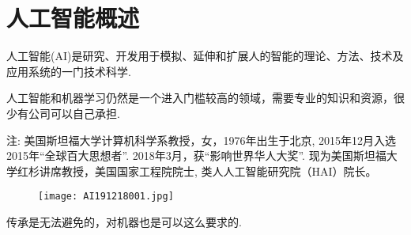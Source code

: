 \chapter{人工智能概述}
\begin{tcolorbox}[colback=white!50,colframe=orange!50,title=人工智能]
\begin{center}
   人工智能(AI)是研究、开发用于模拟、延伸和扩展人的智能的理论、方法、技术及应用系统的一门技术科学.\hfill
\end{center}
\end{tcolorbox}
\begin{tcolorbox}[colback=white!50, colframe=orange!50, title=李飞飞]
\begin{center}
   人工智能和机器学习仍然是一个进入门槛较高的领域，需要专业的知识和资源，很少有公司可以自己承担.\hfill
\end{center}
\end{tcolorbox}
注: 美国斯坦福大学计算机科学系教授，女，1976年出生于北京, 2015年12月入选2015年“全球百大思想者”. 2018年3月，获“影响世界华人大奖”.
现为美国斯坦福大学红杉讲席教授，美国国家工程院院士, 类人人工智能研究院（HAI）院长。
\begin{figure}[H]
\centering
\texttt{[image: AI191218001.jpg]}
\label{AI191218001}
\end{figure}
\begin{tcolorbox}[colback=white!50, colframe=orange!50, title=无名氏]
\begin{center}
   传承是无法避免的，对机器也是可以这么要求的.\hfill
\end{center}
\end{tcolorbox}
